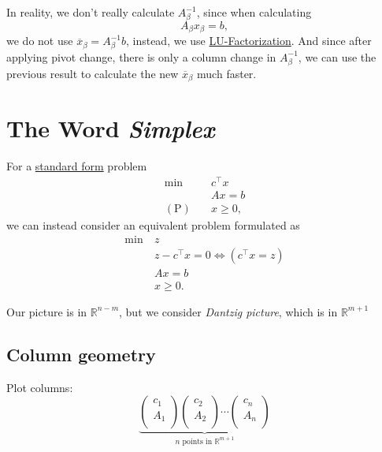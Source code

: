 \begin{note}
	In reality, we don't really calculate \(A^{-1}_{\beta}\), since when calculating
	\[
		A_{\beta}x_{\beta} = b,
	\]
	we do not use \(\overline{x}_{\beta} = A^{-1}_{\beta}b\), instead, we use \href{https://en.wikipedia.org/wiki/LU_decomposition}{LU-Factorization}. And since after applying pivot change, there is only a column change in \(A^{-1}_{\beta}\), we can use the previous result to calculate the new \(\overline{x}_{\beta}\) much faster.
\end{note}

\section{The Word \emph{Simplex}}
For a \hyperref[def:standard-form]{standard form} problem
\[
	\begin{aligned}
		\min~             & c^{\top}x \\
		                  & Ax = b    \\
		(\mathrm{P})\quad & x\geq 0,
	\end{aligned}
\]
we can instead consider an equivalent problem formulated as
\[
	\begin{aligned}
		\min~ & z                                        \\
		      & z - c^{\top} x = 0 \iff (c^{\top} x = z) \\
		      & Ax = b                                   \\
		      & x\geq 0.
	\end{aligned}
\]

\begin{prev}
	Our picture is in \(\mathbb{R}^{n-m}\), but we consider \emph{Dantzig picture}, which is in \(\mathbb{R}^{m+1}\)
\end{prev}

\subsection{Column geometry}
Plot columns:
\[
	\underbrace{
		\begin{pmatrix}
			c_1 \\
			A_1 \\
		\end{pmatrix}
		\begin{pmatrix}
			c_2 \\
			A_2 \\
		\end{pmatrix}
		\cdots
		\begin{pmatrix}
			c_n \\
			A_n \\
		\end{pmatrix}}_{n \text{ points in }\mathbb{R}^{m+1}}
\]

